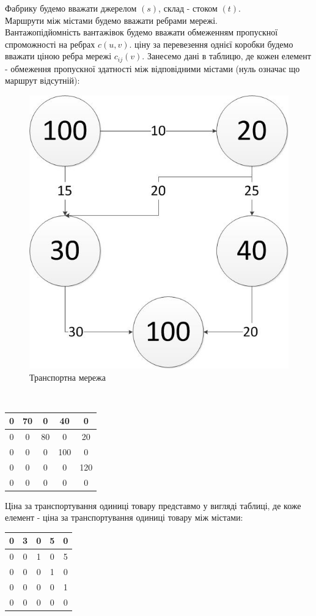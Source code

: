 \documentclass[a4paper,14pt,russian,ukrainian,oneside,final]{extreport}
\begin{document}
\indent Фабрику будемо вважати джерелом $(s)$, склад - стоком $(t)$. \\
Маршрути між містами будемо вважати ребрами мережі.\\
Вантажопідйомність вантажівок будемо вважати обмеженням пропускної спроможності на ребрах $c(u,v)$.
ціну за перевезення однієї коробки будемо вважати ціною ребра мережі $c_{ij}(v)$.
Занесемо дані в таблицю, де кожен елемент - обмеження пропускної здатності між відповідними містами (нуль означає що маршрут відсутній):
\begin{figure}[h]
\begin{center}
\includegraphics[scale=0.65]{p1.jpg}
\caption{Транспортна мережа}
\end{center}
\end{figure}
\\
\begin{center}
\begin{tabular}{|c|c|c|c|c|}
\hline
0&70&0&40&0 \\
\hline
0&0&80&0&20 \\
\hline
0&0&0&100&0 \\
\hline
0&0&0&0&120 \\
\hline
0&0&0&0&0 \\
\hline
\end{tabular}
\end{center}
Ціна за транспортування одиниці товару представмо у вигляді таблиці, де коже елемент - ціна за транспортування одиниці товару між містами:
\begin{center}
\begin{tabular}{|c|c|c|c|c|}
\hline
0&3&0&5&0 \\
\hline
0&0&1&0&5 \\
\hline
0&0&0&1&0 \\
\hline
0&0&0&0&1 \\
\hline
0&0&0&0&0 \\
\hline
\end{tabular}
\end{center}
\end{document}
